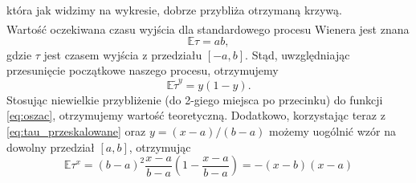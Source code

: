 \documentclass[12pt]{mwart}
\begin{document}
	która jak widzimy na wykresie, dobrze przybliża otrzymaną krzywą.\vspace{1.5mm}\\
	Wartość oczekiwana czasu wyjścia dla standardowego procesu Wienera jest znana\textsuperscript{\cite{art}}
	\begin{equation*}
		\mathbb{E}\mathbb{\tau}=ab,
	\end{equation*}
	gdzie $\tau$ jest czasem wyjścia z przedziału $[-a, b]$. Stąd, uwzględniając przesunięcie początkowe naszego procesu, otrzymujemy
	\begin{equation*}
		\mathbb{E}\widetilde\tau^y=y(1-y).
	\end{equation*}
	Stosując niewielkie przybliżenie (do 2-giego miejsca po przecinku) do funkcji \eqref{eq:oszac}, otrzymujemy wartość teoretyczną. Dodatkowo, korzystając teraz z \eqref{eq:tau_przeskalowane} oraz $y=(x-a)/(b-a)$ możemy uogólnić wzór na dowolny przedział $[a, b]$, otrzymując
	\begin{equation*}
		\mathbb{E}\tau^x=(b-a)^2\frac{x-a}{b-a}\left(1-\frac{x-a}{b-a}\right)=-(x-b)(x-a)
	\end{equation*}

	
\end{document}
